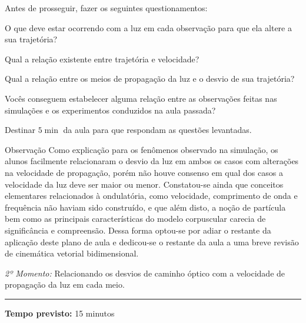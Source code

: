         Antes de prosseguir, fazer os seguintes questionamentos:
        
        \begin{center}
            \colorbox{gray85}{
            \begin{minipage}{0.9\textwidth}
                \begin{quest}
                    O que deve estar ocorrendo com a luz em cada observação para que ela altere a sua trajetória?
                \end{quest}
                \begin{quest}
                    Qual a relação existente entre trajetória e velocidade?
                \end{quest}
                \begin{quest}
                    Qual a relação entre os meios de propagação da luz e o desvio de sua trajetória?
                \end{quest}
                \begin{quest}
                    Vocês conseguem estabelecer alguma relação entre as observações feitas nas simulações e os experimentos conduzidos na aula passada?
                \end{quest}
            \end{minipage}
            }
        \end{center}
        Destinar $5\min$ da aula para que respondam as questões levantadas.

        
        \begin{mybox}[colback=white, colframe=deepred,colbacktitle=deepred!85!deepred,]{Observação}
            Como explicação para os fenômenos observado na simulação, os alunos facilmente relacionaram o desvio da luz em ambos os casos com alterações na velocidade de propagação, porém não houve consenso em qual dos casos a velocidade da luz deve ser maior ou menor. Constatou-se ainda que conceitos elementares relacionados à ondulatória, como velocidade, comprimento de onda e frequência não haviam sido construído, e que além disto, a noção de partícula bem como as principais características do modelo corpuscular carecia de significância e compreensão. Dessa forma optou-se por adiar o restante da aplicação deste plano de aula e dedicou-se o restante da aula a uma breve revisão de cinemática vetorial bidimensional.
        \end{mybox} 
        
        \vspace{60pt}   
        \par\noindent \emph{2º Momento:} Relacionando os desvios de caminho óptico com a velocidade de propagação da luz em cada meio.
        \par\noindent\rule{.3\textwidth}{.5pt}  
        \par\noindent \textbf{Tempo previsto:} 15 minutos

